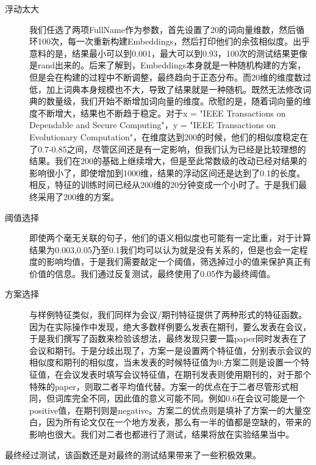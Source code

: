 \documentclass{mcmthesis}
\begin{document}
			\begin{description}
				\item [\qquad \quad 浮动太大] 我们任选了两项FullName作为参数，首先设置了20的词向量维数，然后循环100次，每一次重新构建Embeddings，然后打印他们的余弦相似度。出乎意料的是，结果最小可以到0.001，最大可以到0.93，100次的测试结果更像是rand出来的。后来了解到，Embeddings本身就是一种随机构建的方案，但是会在构建的过程中不断调整，最终趋向于正态分布。而20维的维度数过低，加上词典本身规模也不大，导致了结果就是一种随机。既然无法修改词典的数量级，我们开始不断增加词向量的维度。欣慰的是，随着词向量的维度不断增大，结果也不断趋于稳定。对于x = "IEEE Transactions on Dependable and Secure Computing"，y = "IEEE Transactions on Evolutionary Computation"，在维度达到200的时候，他们的相似度稳定在了0.7-0.85之间，尽管区间还是有一定影响，但我们认为已经是比较理想的结果。我们在200的基础上继续增大，但是至此常数级的改动已经对结果的影响很小了，即使增加到1000维，结果的浮动区间还是达到了0.1的长度。相反，特征的训练时间已经从200维的20分钟变成一个小时了。于是我们最终采用了200维的方案。
				\item [\qquad \quad 阈值选择] 即使两个毫无关联的句子，他们的语义相似度也可能有一定比重，对于计算结果为0.003,0.05乃至0.1我们均可以认为就是没有关系的，但是也会一定程度的影响均值，于是我们需要敲定一个阈值，筛选掉过小的值来保护真正有价值的信息。我们通过反复测试，最终使用了0.05作为最终阈值。
				\item [\qquad \quad 方案选择] 与样例特征类似，我们同样为会议/期刊特征提供了两种形式的特征函数。因为在实际操作中发现，绝大多数样例要么发表在期刊，要么发表在会议，于是我们撰写了函数来检验该想法，最终发现只要一篇paper同时发表在了会议和期刊。于是分歧出现了，方案一是设置两个特征值，分别表示会议的相似度和期刊的相似度，当未发表的时候特征值为0;方案二则是设置一个特征值，在会议发表时填写会议特征值，在期刊发表则使用期刊的，对于那个特殊的paper，则取二者平均值代替。方案一的优点在于二者尽管形式相同，但词库完全不同，因此值的意义可能不同。例如0.6在会议可能是一个positive值，在期刊则是negative。方案二的优点则是填补了方案一的大量空白，因为所有论文仅在一个地方发表，那么有一半的值都是空缺的，带来的影响也很大。我们对二者也都进行了测试，结果将放在实验结果当中。
			\end{description}
			\par 最终经过测试，该函数还是对最终的测试结果带来了一些积极效果。
\end{document}
